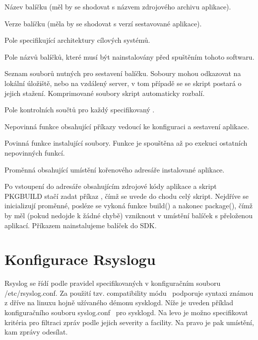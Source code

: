 \documentclass[thesis=B,czech]{FITthesis}[2012/06/26]
\begin{document}
\begin{description}
  \setlength\itemsep{-1ex}
  \item [pkgname:] Název balíčku (měl by se shodovat s názvem zdrojového archivu aplikace).
  \item [pkgver:] Verze balíčku (měla by se shodovat s verzí sestavované aplikace).
  \item [arch:] Pole specifikující architektury cílových systémů.
  \item [depends:] Pole názvů balíčků, které musí být nainstalovány před spuštěním tohoto softwaru.
  \item [source:] Seznam souborů nutných pro sestavení balíčku. Soboury mohou odkazovat na lokální úložiště, nebo na vzdálený server, v tom případě se se skript postará o jejich stažení. Komprimované soubory skript automaticky rozbalí.
  \item [md5sum:] Pole kontrolních součtů pro každý specifikovaný .
  \item [build():] Nepovinná funkce obsahující příkazy vedoucí ke konfiguraci a sestavení aplikace.
  \item [package():] Povinná funkce instalující soubory. Funkce je spouštěna až po exekuci ostatních nepovinných funkcí.
  \item [pkgdir:] Proměnná obsahující umístění kořenového adresáře instalované aplikace.
\end{description}

Po vstoupení do adresáře obsahujícím zdrojové kódy aplikace a skript PKGBUILD stačí zadat příkaz , čímž se uvede do chodu celý skript. Nejdříve se inicializují proměnné, posléze se vykoná funkce build() a nakonec package(), čímž by měl (pokud nedojde k žádné chybě) vzniknout v umístění  balíček s přeloženou aplikací.
Příkazem  nainstalujeme balíček do SDK.

\section{Konfigurace Rsyslogu}
Rsyslog se řídí podle pravidel specifikovaných v konfiguračním souboru /etc/rsyslog.conf. Za použití tzv. compatibility módu~\cite{Rsyslog-comp-mode} podporuje syntaxi známou z dříve na linuxu hojně užívaného démonu sysklogd. Níže je uveden příklad konfiguračního souboru syslog.conf~\cite{Syslog-conf} pro sysklogd. Na levo je možno specifikovat kritéria pro filtraci zpráv podle jejich severity a facility. Na pravo je pak umístění, kam zprávy odesílat.
\end{document}

